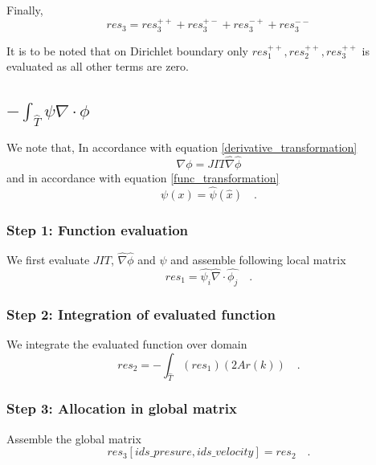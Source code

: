 \documentclass[a4paper]{book}
\begin{document}
Finally,
\begin{equation}
res_3 = res_3^{++} + res_3^{+-} + res_3^{-+} + res_3^{--} 
\end{equation}

It is to be noted that on Dirichlet boundary only $res_1^{++}, res_2^{++}, res_3^{++}$ is evaluated as all other terms are zero.

\subsection{$-\int_{\hat{T}} \psi \nabla \cdot \phi$}

We note that, In accordance with equation \ref{derivative_transformation}
\begin{equation}
\nabla \phi = JIT \hat{\nabla} \hat{\phi}
\end{equation}
and in accordance with equation \ref{func_transformation}
\begin{equation}
\psi(x) = \hat{\psi} (\hat{x}) \quad \textrm{.}
\end{equation}

\subsubsection{Step 1: Function evaluation}
We first evaluate $JIT$, $\hat{\nabla} \hat{\phi}$ and $\psi$ and assemble following local matrix\\
\begin{equation}
res_1 = \hat{\psi_i} \hat{\nabla} \cdot \hat{\phi_j} \quad \textrm{.}
\end{equation}

\subsubsection{Step 2: Integration of evaluated function}
We integrate the evaluated function over domain\\
\begin{equation}
res_2 = -\int_{\hat{T}} (res_1) (2 Ar(k)) \quad \textrm{.}
\end{equation}

\subsubsection{Step 3: Allocation in global matrix}

Assemble the global matrix\\
\begin{equation}
res_3[ids\_presure,ids\_velocity] = res_2 \quad \textrm{.}
\end{equation}
\end{document}

